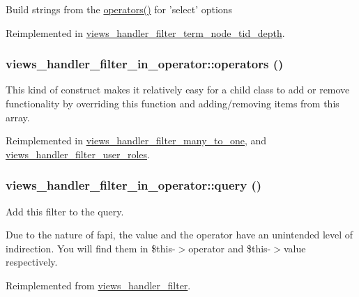 \label{classviews__handler__filter__in__operator_a5b972dd25d26a7010ae9f63cbc926577}
Build strings from the \hyperlink{classviews__handler__filter__in__operator_ae22d2c1d388a5b1457960c492ffc1fe1}{operators()} for 'select' options 

Reimplemented in \hyperlink{classviews__handler__filter__term__node__tid__depth_aa96e237e053dea657d9c419aecea51c4}{views\_\-handler\_\-filter\_\-term\_\-node\_\-tid\_\-depth}.\hypertarget{classviews__handler__filter__in__operator_ae22d2c1d388a5b1457960c492ffc1fe1}{
\subsubsection[{operators}]{\setlength{\rightskip}{0pt plus 5cm}views\_\-handler\_\-filter\_\-in\_\-operator::operators ()}}
\label{classviews__handler__filter__in__operator_ae22d2c1d388a5b1457960c492ffc1fe1}
This kind of construct makes it relatively easy for a child class to add or remove functionality by overriding this function and adding/removing items from this array. 

Reimplemented in \hyperlink{classviews__handler__filter__many__to__one_ae397d071d9f55b4053b88f01572e700f}{views\_\-handler\_\-filter\_\-many\_\-to\_\-one}, and \hyperlink{classviews__handler__filter__user__roles_a9ec9e9b4e15492709ed2be2951dc6d19}{views\_\-handler\_\-filter\_\-user\_\-roles}.\hypertarget{classviews__handler__filter__in__operator_af4b9a596ad1e6fbee116977ca0a7d8a9}{
\subsubsection[{query}]{\setlength{\rightskip}{0pt plus 5cm}views\_\-handler\_\-filter\_\-in\_\-operator::query ()}}
\label{classviews__handler__filter__in__operator_af4b9a596ad1e6fbee116977ca0a7d8a9}
Add this filter to the query.

Due to the nature of fapi, the value and the operator have an unintended level of indirection. You will find them in \$this-\/$>$operator and \$this-\/$>$value respectively. 

Reimplemented from \hyperlink{classviews__handler__filter_a8e513b3abbc2559f37b550ca4957b4ae}{views\_\-handler\_\-filter}.

